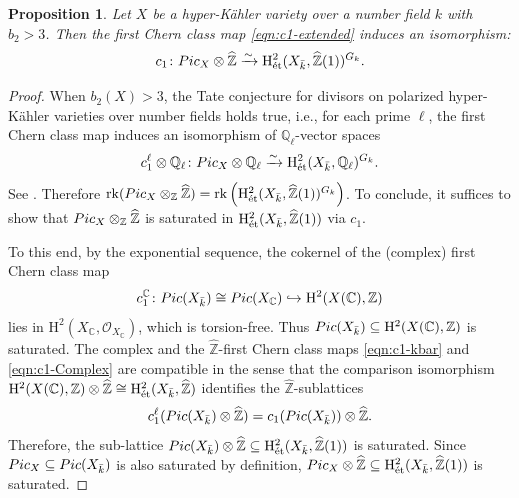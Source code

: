 \documentclass[11pt,reqno,oneside]{amsart}
\numberwithin{equation}{section}
\newtheorem{proposition}[theorem]{Proposition}
\theoremstyle{definition}
\DeclareMathOperator{\rk}{rk}
\newcommand{\Pic}{{\rm Pic}}
\DeclareMathOperator{\et}{\Acute{e}t}
\newcommand\rH{\mathrm{H}}
\newcommand{\CC}{\mathbb{C}}
\newcommand{\QQ}{\mathbb{Q}}
\newcommand{\ZZ}{\mathbb{Z}}
\begin{document}
\begin{proposition}\label{prop:TateConjecture}
Let $X$ be a hyper-Kähler variety over a number field $k$ with $b_2>3$. Then the first Chern class map \eqref{eqn:c1-extended} induces an isomorphism:
\[
c_1  \colon \Pic_X \otimes \widehat{\ZZ} \xrightarrow{\sim} \rH^2_{\et}(X_{\bar{k}}, \widehat{\ZZ}(1))^{G_k}.
\]
\end{proposition}
\begin{proof}
When $b_2(X)>3$, the Tate conjecture for divisors on polarized hyper-Kähler varieties over number fields holds true, i.e., for each prime $\ell$, the first Chern class map induces an isomorphism of $\QQ_{\ell}$-vector spaces
\[
c_1^{\ell} \otimes \QQ_{\ell} \colon \Pic_X \otimes \QQ_{\ell} \xrightarrow{\sim} \rH^2_{\et}(X_{\bar{k}}, \QQ_{\ell})^{G_k}.
\]
See \cite[Theorem 1.6.1 (2)]{A96}.
Therefore $\rk (\Pic_X \otimes_{\ZZ} \widehat{\ZZ}) = \rk \left(\rH^2_{\et}(X_{\bar{k}}, \widehat{\ZZ}(1))^{G_k}\right)$. To conclude, it suffices to show that $\Pic_{X} \otimes_{\ZZ} \widehat{\ZZ}$ is saturated in $\rH^2_{\et}(X_{\bar{k}}, \widehat{\ZZ}(1))$ via $c_1$.

To this end, by the exponential sequence, the cokernel of the (complex) first Chern class map 
\begin{equation}
    \label{eqn:c1-Complex}
    c_1^{\CC}\colon \Pic(X_{\bar{k}}) \cong \Pic(X_{\CC}) \hookrightarrow \rH^2(X(\CC), \ZZ)
\end{equation}
lies in $\rH^2(X_{\CC}, \mathcal{O}_{X_{\CC}})$, which is torsion-free. Thus $\Pic(X_{\bar{k}}) \subseteq  \rH^2(X(\CC), \ZZ)$ is saturated.
The complex and the $\widehat{\ZZ}$-first Chern class maps \eqref{eqn:c1-kbar} and \eqref{eqn:c1-Complex} are compatible in the sense that the comparison isomorphism 
$\rH^2(X(\CC), \ZZ)\otimes \widehat{\ZZ}\cong \rH^2_{\et}(X_{\bar{k}}, \widehat{\ZZ})$ 
identifies the $\widehat{\ZZ}$-sublattices 
\begin{equation}
c_1^\ell(\Pic(X_{\bar{k}})\otimes \widehat{\ZZ}) = c_1(\Pic(X_{\bar{k}}))\otimes \widehat{\ZZ}.
\end{equation}
Therefore, the sub-lattice $\Pic(X_{\bar{k}})\otimes \widehat{\ZZ} \subseteq  \rH^2_{\et}(X_{\bar{k}}, \widehat{\ZZ}(1))$ is saturated.
Since $\Pic_X \subseteq \Pic(X_{\bar{k}})$ is also saturated by definition, $\Pic_X\otimes \widehat{\ZZ} \subseteq  \rH^2_{\et}(X_{\bar{k}}, \widehat{\ZZ}(1))$ is saturated. 
\end{proof}
\end{document}
